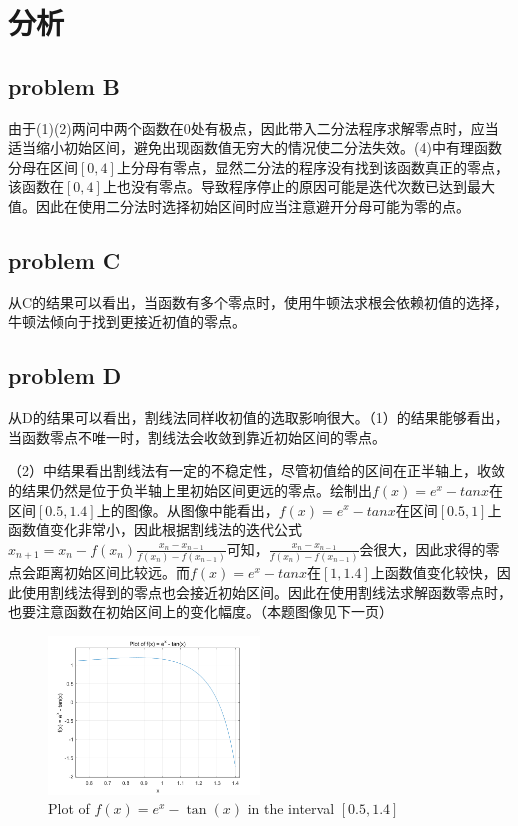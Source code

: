 \documentclass[a4paper]{article}
\begin{document}
\section*{分析}
\subsection{problem B}
由于(1)(2)两问中两个函数在0处有极点，因此带入二分法程序求解零点时，应当适当缩小初始区间，避免出现函数值无穷大的情况使二分法失效。(4)中有理函数分母在区间$[0,4]$上分母有零点，显然二分法的程序没有找到该函数真正的零点，该函数在$[0,4]$上也没有零点。导致程序停止的原因可能是迭代次数已达到最大值。因此在使用二分法时选择初始区间时应当注意避开分母可能为零的点。

\subsection{problem C}
从C的结果可以看出，当函数有多个零点时，使用牛顿法求根会依赖初值的选择，牛顿法倾向于找到更接近初值的零点。

\subsection{problem D}
从D的结果可以看出，割线法同样收初值的选取影响很大。（1）的结果能够看出，当函数零点不唯一时，割线法会收敛到靠近初始区间的零点。


（2）中结果看出割线法有一定的不稳定性，尽管初值给的区间在正半轴上，收敛的结果仍然是位于负半轴上里初始区间更远的零点。绘制出$f(x)=e^x-tan x$在区间$[0.5,1.4]$上的图像。从图像中能看出，$f(x)=e^x-tan x$在区间$[0.5,1]$上函数值变化非常小，因此根据割线法的迭代公式$x_{n+1}=x_n-f(x_n)\frac{x_n-x_{n-1}}{f(x_n)-f(x_{n-1})}$可知，$\frac{x_n-x_{n-1}}{f(x_n)-f(x_{n-1})}$会很大，因此求得的零点会距离初始区间比较远。而$f(x)=e^x-tan x$在$[1,1.4]$上函数值变化较快，因此使用割线法得到的零点也会接近初始区间。因此在使用割线法求解函数零点时，也要注意函数在初始区间上的变化幅度。（本题图像见下一页）
\vfill  %

\begin{figure}[H]  %
	\centering
	\includegraphics[width=0.5\textwidth]{f1.png}  %
	\caption{Plot of $f(x) = e^x - \tan(x)$ in the interval $[0.5, 1.4]$}
	\label{fig:function_plot}
\end{figure}
\end{document}
